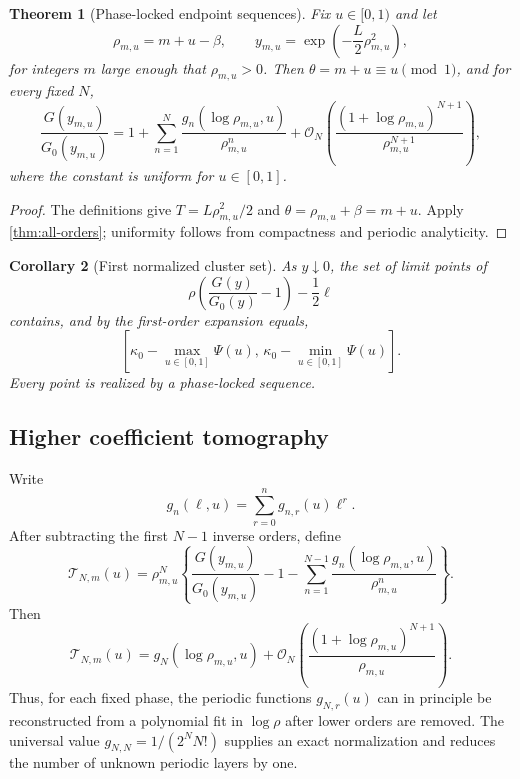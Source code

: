 \documentclass[11pt,oneside]{article}
\numberwithin{equation}{section}
\newtheorem{theorem}{Theorem}[section]
\newtheorem{corollary}[theorem]{Corollary}
\theoremstyle{definition}
\theoremstyle{remark}
\newcommand{\cO}{\mathcal O}
\newcommand{\Gzero}{G_0}
\begin{document}
\begin{theorem}[Phase-locked endpoint sequences]
\label{thm:phase-locked}
Fix $u\in[0,1)$ and let
\begin{equation}
 \rho_{m,u}=m+u-\beta,
 \qquad
 y_{m,u}=\exp\left(-\frac L2\rho_{m,u}^2\right),
 \label{eq:phase-locked-sequence}
\end{equation}
for integers $m$ large enough that $\rho_{m,u}>0$.  Then
$\theta=m+u\equiv u\pmod1$, and for every fixed $N$,
\begin{equation}
 \frac{G(y_{m,u})}{\Gzero(y_{m,u})}
 =1+\sum_{n=1}^{N}
 \frac{g_n(\log\rho_{m,u},u)}{\rho_{m,u}^n}
 +\cO_N\left(\frac{(1+\log\rho_{m,u})^{N+1}}
 {\rho_{m,u}^{N+1}}\right),
 \label{eq:phase-locked-expansion}
\end{equation}
where the constant is uniform for $u\in[0,1]$.
\end{theorem}

\begin{proof}
The definitions give $T=L\rho_{m,u}^2/2$ and
$\theta=\rho_{m,u}+\beta=m+u$.  Apply \cref{thm:all-orders}; uniformity follows from compactness and periodic analyticity.
\end{proof}

\begin{corollary}[First normalized cluster set]
\label{cor:first-cluster}
As $y\downarrow0$, the set of limit points of
\begin{equation}
 \rho\left(\frac{G(y)}{\Gzero(y)}-1\right)-\frac12\ell
 \label{eq:first-normalized}
\end{equation}
contains, and by the first-order expansion equals,
\begin{equation}
 \left[\kappa_0-\max_{u\in[0,1]}\Psi(u),\,
 \kappa_0-\min_{u\in[0,1]}\Psi(u)\right].
 \label{eq:first-cluster-interval}
\end{equation}
Every point is realized by a phase-locked sequence.
\end{corollary}

\subsection{Higher coefficient tomography}
Write
\begin{equation}
 g_n(\ell,u)=\sum_{r=0}^{n}g_{n,r}(u)\ell^r.
 \label{eq:gn-ell-decomposition}
\end{equation}
After subtracting the first $N-1$ inverse orders, define
\begin{equation}
 \mathcal T_{N,m}(u)=\rho_{m,u}^{N}
 \left\{\frac{G(y_{m,u})}{\Gzero(y_{m,u})}-1
 -\sum_{n=1}^{N-1}\frac{g_n(\log\rho_{m,u},u)}{\rho_{m,u}^{n}}\right\}.
 \label{eq:tomography-statistic}
\end{equation}
Then
\begin{equation}
 \mathcal T_{N,m}(u)=g_N(\log\rho_{m,u},u)
 +\cO_N\left(\frac{(1+\log\rho_{m,u})^{N+1}}{\rho_{m,u}}\right).
 \label{eq:tomography-limit}
\end{equation}
Thus, for each fixed phase, the periodic functions $g_{N,r}(u)$ can in principle be reconstructed from a polynomial fit in $\log\rho$ after lower orders are removed.  The universal value
$g_{N,N}=1/(2^N N!)$ supplies an exact normalization and reduces the number of unknown periodic layers by one.
\end{document}
